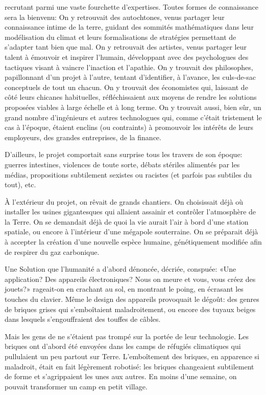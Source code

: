 recrutant parmi une vaste fourchette d'expertises.  
Toutes formes de connaissance sera la bienvenu:
On y
retrouvait des autochtones, venus partager leur connaissance intime de la
terre, guidant des sommités mathé\-matiques dans leur modélisation du climat et
leurs formalisations de stra\-tégies permettant de s'adapter tant
bien que mal.  On y retrouvait des artistes, venus partager leur talent à
émouvoir et inspirer l'humain, développant avec des psychologues des
tactiques visant à vaincre l'in\-act\-ion et l'apathie.  On y trouvait des
philosophes, papillonnant d'un projet à l'autre, tentant d'identifier, à
l'avance, les culs-de-sac con\-cept\-uels de tout un chacun.  On y trouvait
des économistes qui, laissant de côté leurs chicanes habituelles,
réfléchissaient aux moyens de rendre les solutions proposées viables à
large échelle et à long terme.  On y trouvait aussi, bien sûr, un grand
nombre d'ingénieurs et autres technologues qui, comme c'était trist\-ement
le cas à l'époque, étaient enclins (ou contraints) à promouvoir les
intérêts de leurs employeurs, des grandes entreprises, de la finance.

D'ailleurs, le projet \nomProjet{} comportait sans surprise tous les
travers de son époque: guerres intestines, violences de toute sorte, débats
stériles alimentés par les médias, propositions
subti\-le\-ment sexistes ou racistes (et parfois pas subtiles du tout), etc.

À l'extérieur du projet, on rêvait de grands chantiers.  On choisissait
déjà où installer les usines gigantesques qui allaient assainir et
contrô\-ler l'at\-mosphère de la Terre. On se demandait déjà de quoi la vie
aurait l'air à bord d'une station spatiale, ou encore à l'intérieur d'une
mégapole souterraine. On se préparait déjà à accepter la création d'une
nouvelle espèce humaine, génétiquement modifiée afin de respirer du gaz
carbo\-nique.


Une Solution que l'humanité a d'abord dénoncée, décriée, conspuée: «Une
application? Des appareils électroniques? Nous on meure et vous, vous créez des
jouets?» rageait-on en crachant au sol, en montrant le poing, en écrasant
les touches du clavier.  Même le design des appareils provoquait le
dégoût: des genres de briques grises qui s'emboîtaient mala\-droi\-tement, ou
encore des tuyaux beiges dans lesquels s'engouffraient des touffes
de câbles.


Mais les gens de \nomProjet{} ne s'étaient pas trompé sur la portée de
leur technologie.
Les briques ont d'abord été envoyées dans les
camps de réfugiés climatiques qui pullu\-laient un peu partout sur Terre.
L'emboît\-e\-ment des briques, en apparence si maladroit,
était en fait légèrement robotisé: les briques changeaient subtilement de
forme et s'a\-grip\-paient les unes aux autres. En moins d'une semaine, on
pouvait transfor\-mer un camp en petit village.

